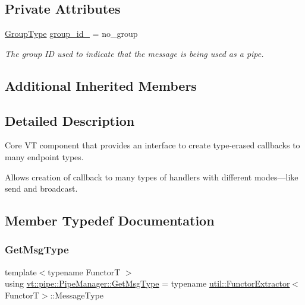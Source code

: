 \subsection*{Private Attributes}
\begin{DoxyCompactItemize}
\item 
\hyperlink{namespacevt_a27b5e4411c9b6140c49100e050e2f743}{Group\+Type} \hyperlink{structvt_1_1pipe_1_1_pipe_manager_a55c4e1e68f74a2a0796a24ea06711563}{group\+\_\+id\+\_\+} = no\+\_\+group
\begin{DoxyCompactList}\small\item\em The group ID used to indicate that the message is being used as a pipe. \end{DoxyCompactList}\end{DoxyCompactItemize}
\subsection*{Additional Inherited Members}


\subsection{Detailed Description}
Core VT component that provides an interface to create type-\/erased callbacks to many endpoint types. 

Allows creation of callback to many types of handlers with different modes---like send and broadcast. 

\subsection{Member Typedef Documentation}
\mbox{\label{structvt_1_1pipe_1_1_pipe_manager_a221ce8bc0fc6639f43dad1e53a08c0d2}} 
\subsubsection{\texorpdfstring{Get\+Msg\+Type}{GetMsgType}}
{\footnotesize\ttfamily template$<$typename FunctorT $>$ \\
using \hyperlink{structvt_1_1pipe_1_1_pipe_manager_a221ce8bc0fc6639f43dad1e53a08c0d2}{vt\+::pipe\+::\+Pipe\+Manager\+::\+Get\+Msg\+Type} =  typename \hyperlink{structvt_1_1util_1_1_functor_extractor}{util\+::\+Functor\+Extractor}$<$FunctorT$>$\+::Message\+Type}

